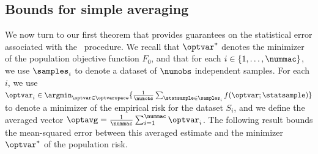 \documentclass[11pt,twoside]{article}
\theoremstyle{definition}
\begin{document}



\subsection{Bounds for simple averaging}

We now turn to our first theorem that provides guarantees on the
statistical error associated with the \avgm\ procedure.  We recall
that $\optvar^*$ denotes the minimizer of the population objective
function $F_0$, and that for each $i \in \{1, \ldots, \nummac\}$, we
use $\samples_i$ to denote a dataset of $\numobs$ independent samples.
For each $i$, we use \mbox{$\optvar_{i} \in \argmin_{\optvar
    \in \optvarspace} \{ \frac{1}{\numobs} \sum_{\statsample
    \in \samples_i} f(\optvar; \statsample)\}$} to denote a minimizer
of the empirical risk for the dataset $S_i$, and we define the
averaged vector $\optavg = \frac{1}{\nummac} \sum_{i=1}^\nummac
\optvar_{i}$.  The following result bounds the mean-squared error
between this averaged estimate and the minimizer $\optvar^*$ of the
population risk.
\end{document}
